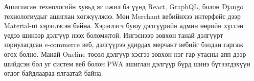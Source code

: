 Ашигласан технологийн хувьд яг ижил ба үүнд React, GraphQL, болон Django технологиудыг ашиглан хөгжүүлжээ. Мөн Merchant вебийнхээ интерфейс дээр Material-ui хэрэглэсэн байна. Хэрэглэгч буюу дэлгүүрийн админ өөрийн хүссэн үедээ шинээр дэлгүүр нээх боломжтой. Ингэснээр зөвхөн танай дэлгүүрт зориулагдсан e-commerce веб, дэлгүүрээ удирдах мерчант вебийг бэлдэн гаргаж өгөх болно. Манай Oneline төсөл дэлгүүр хэсгээ зөвхөн нэг гар утасны апп дээр шийдсэн бол уг систем веб болон PWA ашиглан дэлгүүр бүрд шинэ бүтээгдэхүүн өгдөг байдлаараа ялгаатай байна.